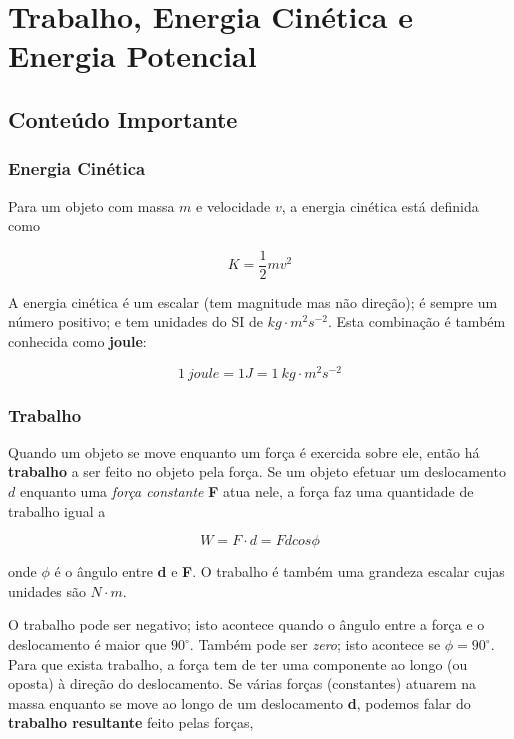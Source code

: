 \section{Trabalho, Energia Cinética e Energia Potencial}
\subsection{Conteúdo Importante}
\subsubsection{Energia Cinética}

Para um objeto com massa $m$ e velocidade $v$, a energia cinética está definida como

\begin{equation}
    K=\frac{1}{2}mv^2
\end{equation}

A energia cinética é um escalar (tem magnitude mas não direção); é sempre um número positivo; e tem unidades do SI de $kg\cdot m^2s^{-2}$. Esta combinação é também conhecida como \textbf{joule}:

\begin{equation}
    1\ joule=1J=1\ kg\cdot m^2s^{-2}
\end{equation}

\subsubsection{Trabalho}
Quando um objeto se move enquanto um força é exercida sobre ele, então há \textbf{trabalho} a ser feito no objeto pela força.
Se um objeto efetuar um deslocamento $d$ enquanto uma \emph{força constante} \textbf{F} atua nele, a força faz uma quantidade de trabalho igual a

$$
W=F\cdot d=Fdcos\phi
$$

onde $\phi$ é o ângulo entre \textbf{d} e \textbf{F}. O trabalho é também uma grandeza escalar cujas unidades são $N\cdot m$.

O trabalho pode ser negativo; isto acontece quando o ângulo entre a força e o deslocamento é maior que $90^{\circ}$. Também pode ser \emph{zero}; isto acontece se $\phi=90^{\circ}$. Para que exista trabalho, a força tem de ter uma componente ao longo (ou oposta) à direção do deslocamento.
Se várias forças (constantes) atuarem na massa enquanto se move ao longo de um deslocamento \textbf{d}, podemos falar do \textbf{trabalho resultante} feito pelas forças,

